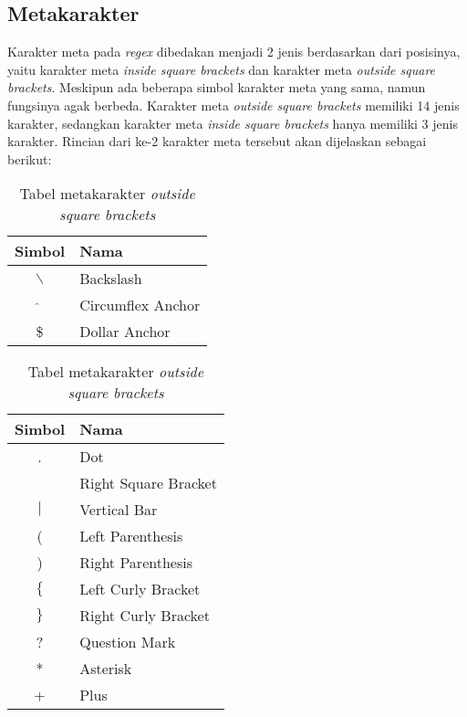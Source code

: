 \subsection{Metakarakter}

Karakter meta pada \textit{regex} dibedakan menjadi 2 jenis berdasarkan dari posisinya, yaitu karakter meta \textit{inside square brackets} dan karakter meta \textit{outside square brackets}. Meskipun ada beberapa simbol karakter meta yang sama, namun fungsinya agak berbeda. Karakter meta \textit{outside square brackets} memiliki 14 jenis karakter, sedangkan karakter meta \textit{inside square brackets} hanya memiliki 3 jenis karakter. Rincian dari ke-2 karakter meta tersebut akan dijelaskan sebagai berikut:

\begin{table}[H]
	\renewcommand{\arraystretch}{1.5}
	\caption {Tabel metakarakter \textit{outside square brackets}} 
	\label{tab:metacharacters-outside}
	\begin{center}
		\begin{tabular}{|c|l|}
		\hline 
		Simbol & Nama \\ 
		\hline 
		$\backslash$ & Backslash \\ 
		\hline 
		$\hat{}$ & Circumflex Anchor\\ 
		\hline 
		\$ & Dollar Anchor\\ 
		\hline 
		\end{tabular} 
	\end{center}
\end{table}
	
\begin{table}[H]
	\renewcommand{\arraystretch}{1.5}
	\caption {Tabel metakarakter \textit{outside square brackets}} 
	\label{tab:metacharacters-outside2}
	\begin{center}
		\begin{tabular}{|c|l|}
		\hline 
		Simbol & Nama \\ 
		\hline 
		. & Dot \\ 
		\hline 
		[ & Left Square Bracket \\ 
		\hline
		] & Right Square Bracket \\ 
		\hline 
		$\vert$ & Vertical Bar \\ 
		\hline 
		( & Left Parenthesis \\ 
		\hline 
		) & Right Parenthesis \\ 
		\hline 
		$\lbrace$ & Left Curly Bracket \\ 
		\hline
		$\rbrace$ & Right Curly Bracket \\ 
		\hline 
		? & Question Mark \\ 
		\hline 
		* & Asterisk \\ 
		\hline 
		+ & Plus \\ 
		\hline 
		\end{tabular} 
	\end{center}
\end{table}


